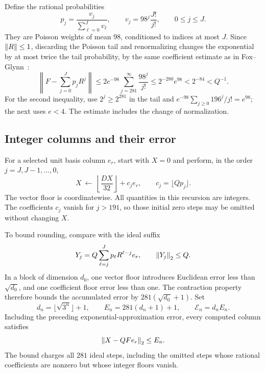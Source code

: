Define the rational probabilities
\begin{equation}\label{eq:thermal72-coefficients}
 p_j=\frac{v_j}{\sum_{\ell=0}^Jv_\ell},
 \qquad v_j=98^j\frac{J!}{j!},
 \qquad 0\le j\le J.
\end{equation}
They are Poisson weights of mean \(98\), conditioned to indices at most
\(J\). Since \(\left\lVert R\right\rVert\le1\), discarding the Poisson tail and renormalizing
changes the exponential by at most twice the tail probability, by the
same coefficient estimate as in Fox--Glynn~\cite[Proposition~1]{FoxGlynn1988}:
\[
 \left\|F-\sum_{j=0}^Jp_jR^j\right\|
 \le 2e^{-98}\sum_{j=281}^{\infty}\frac{98^j}{j!}
 \le2^{-280}e^{98}<2^{-84}<Q^{-1}.
\]
For the second inequality, use \(2^j\ge2^{281}\) in the tail and
\(e^{-98}\sum_{j\ge0}196^j/j!=e^{98}\); the next uses \(e<4\).
The estimate includes the change of normalization.

\subsection{Integer columns and their error}

For a selected unit basis column \(e_r\), start with \(X=0\) and perform,
in the order \(j=J,J-1,\ldots,0\),
\begin{equation}\label{eq:thermal72-horner}
 X\ \longleftarrow\
 \left\lfloor\frac{DX}{32}\right\rfloor+c_je_r,
 \qquad c_j=\lfloor Qp_j\rfloor.
\end{equation}
The vector floor is coordinatewise. All quantities in this recursion are
integers. The coefficients \(c_j\) vanish for \(j>191\), so those initial
zero steps may be omitted without changing \(X\).

To bound rounding, compare with the ideal suffix
\[
 Y_j=Q\sum_{\ell=j}^Jp_\ell R^{\ell-j}e_r,\qquad \left\lVert Y_j\right\rVert_2\le Q.
\]
In a block of dimension \(d_0\), one vector floor introduces Euclidean
error less than \(\sqrt{d_0}\), and one coefficient floor error less than
one. The contraction property therefore bounds the accumulated error
by \(281(\sqrt{d_0}+1)\). Set
\begin{equation}\label{eq:thermal72-errors}
 d_n=\lfloor\sqrt{3^n}\rfloor+1,\qquad
 E_n=281(d_n+1)+1,\qquad \mathcal E_n=d_nE_n.
\end{equation}
Including the preceding exponential-approximation error, every computed
column satisfies
\begin{equation}\label{eq:thermal72-column-error}
 \left\lVert X-QFe_r\right\rVert_2\le E_n.
\end{equation}
The bound charges all \(281\) ideal steps, including the omitted steps
whose rational coefficients are nonzero but whose integer floors vanish.

